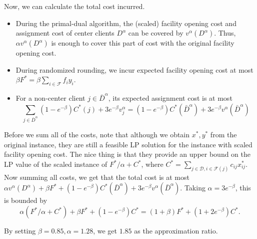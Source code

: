 Now, we can calculate the total cost incurred.
\begin{itemize}
\item During the primal-dual algorithm,
the (scaled) facility opening cost and assignment cost of center clients $D^\alpha$
can be covered by $v^\alpha(D^\alpha)$. Thus, $\alpha v^\alpha(D^\alpha)$ is
enough to cover this part of cost with the original facility opening cost.
\item During randomized rounding, we incur expected facility opening cost
at most
$\beta F^* = \beta \sum_{i \in \mathcal{F}} f_i y_i$.
\item For a non-center client $j \in \bar D^\alpha$, its expected assignment cost
is at most
\[  \sum_{j \in \bar D^\alpha} (1-e^{-\beta}) C^*(j) + 3e^{-\beta}v^\alpha_j = (1-e^{-\beta}) C^*(\bar D^\alpha) + 3e^{-\beta}v^\alpha(\bar D^\alpha) \]
\end{itemize}
Before we sum all of the costs, note that although we obtain $x^*, y^*$ from the original instance,
they are still a feasible LP solution for the instance with scaled facility opening cost.
The nice thing is that they provide an upper bound on the LP value of the scaled instance of
$F^*/\alpha + C^*$,
where $C^* = \sum_{j \in \mathcal{D}, i \in \mathcal{F}(j)} c_{ij} x^*_{ij}$. Now summing all costs, we get that the total cost is at most
$\alpha v^\alpha(D^\alpha) + \beta F^* + (1-e^{-\beta}) C^*(\bar D^\alpha) + 3e^{-\beta}v^\alpha(\bar D^\alpha)$.
Taking $\alpha = 3e^{-\beta}$, this is bounded by
\[
\alpha(F^*/\alpha + C^*) + \beta F^* + (1-e^{-\beta}) C^* %
= (1 + \beta) F^* + (1 + 2e^{-\beta}) C^*.
\]

By setting $\beta=0.85, \alpha=1.28$, we get $1.85$ as the approximation ratio.
